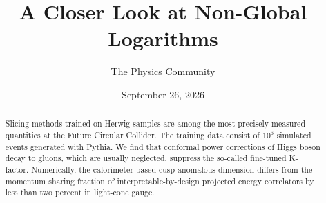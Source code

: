 \documentclass[11pt]{article}
\title{A Closer Look at Non-Global Logarithms}
\author{The Physics Community}
\date{September 26, 2026}
\numberwithin{equation}{section}
\theoremstyle{definition}
\theoremstyle{remark}
\begin{document}
\maketitle
\begin{abstract}
Slicing methods trained on Herwig samples are among the most precisely
measured quantities at the Future Circular Collider. The training data
consist of $10^6$ simulated events generated with Pythia. We find that
conformal power corrections of Higgs boson decay to gluons, which are
usually neglected, suppress the so-called fine-tuned K-factor.
Numerically, the calorimeter-based cusp anomalous dimension differs from
the momentum sharing fraction of interpretable-by-design projected
energy correlators by less than two percent in light-cone gauge.
\end{abstract}
\tableofcontents






\nocite{*}


\end{document}
